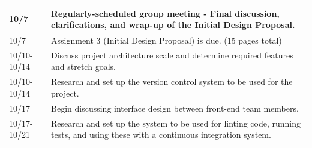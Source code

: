 \documentclass[
    paper=letter,
    parskip=half,
    fontsize=12pt,
    titlepage=firstiscover,
    toc=bibliography,
    numbers=endperiod
]{scrartcl}
\begin{document}
{\begin{tabularx}{\textwidth}{|l|X|}
        10/7          & Regularly-scheduled group meeting - Final discussion, clarifications, and wrap-up of the Initial Design Proposal.                                                                                                                                                                                                                                                                                                                    \\\hline
        10/7          & Assignment 3 (Initial Design Proposal) is due. (15 pages total)                                                                                                                                                                                                                                                                                                                                                                      \\\hline
        10/10-10/14   & Discuss project architecture scale and determine required features and stretch goals.                                                                                                                                                                                                                                                                                                                                                \\\hline
        10/10-10/14   & Research and set up the version control system to be used for the project.                                                                                                                                                                                                                                                                                                                                                           \\\hline
        10/17         & Begin discussing interface design between front-end team members.                                                                                                                                                                                                                                                                                                                                                                    \\\hline
        10/17-10/21   & Research and set up the system to be used for linting code, running tests, and using these with a continuous integration system.                                                                                                                                                                                                                                                                                                     \\\hline

\end{tabularx}}
\end{document}
